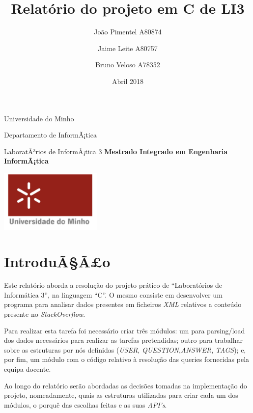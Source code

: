 \documentclass{article}
\title{\bf{\textcolor{Mahogany}{Relat\'{o}rio do projeto em C de LI3}}}
\author{Jo\~{a}o Pimentel A80874 \and Jaime Leite A80757 \and Bruno Veloso A78352 }
\date{Abril 2018}
\begin{document}
\maketitle
\begin{center}

\par
\large {Universidade do Minho}
\par
\large {Departamento de InformÃ¡tica}
\par
\large {LaboratÃ³rios de InformÃ¡tica 3}
\vfill
\bf Mestrado Integrado em Engenharia InformÃ¡tica
\par
\includegraphics[width=5cm]{UM}
\end{center}

\newpage

\tableofcontents

\newpage

\section{IntroduÃ§Ã£o}

\par Este relat\'{o}rio aborda a resolu\c{c}\~{a}o do projeto pr\'{a}tico de \textquotedblleft{}Laborat\'{o}rios de Inform\'{a}tica 3\textquotedblright{}, na linguagem \textquotedblleft{}C\textquotedblright{}. O mesmo consiste em desenvolver um programa para analisar dados presentes em ficheiros \emph{XML} relativos a conte\'{u}do presente no \emph{StackOverflow}.

\par Para realizar esta tarefa foi necess\'{a}rio criar tr\^{e}s m\'{o}dulos: um para parsing/load dos dados necess\'{a}rios para realizar as tarefas pretendidas; outro para trabalhar sobre as estruturas por n\'{o}s definidas (\emph{USER}, \emph{QUESTION},\emph{ANSWER}, \emph{TAGS}); e, por fim, um m\'{o}dulo com o c\'{o}digo relativo \`{a} resolu\c{c}\~{a}o das queries fornecidas pela equipa docente.  

\par Ao longo do relat\'{o}rio ser\~{a}o abordadas as decis\~{o}es tomadas na implementa\c{c}\~{a}o do projeto, nomeadamente, quais as estruturas utilizadas para criar cada um dos m\'{o}dulos, o porqu\^{e} das escolhas feitas e as suas \emph{API's}.
\end{document}
